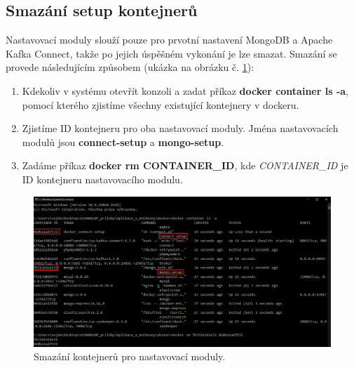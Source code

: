 \subsection{Smazání setup kontejnerů}
Nastavovací moduly slouží pouze pro prvotní nastavení MongoDB a Apache Kafka Connect, takže po jejich úspěšném vykonání je lze smazat. Smazání se provede následujícím způsobem (ukázka na obrázku č. \ref{fig:docker_remove}):
\begin{enumerate}
\item Kdekoliv v systému otevřít konzoli a zadat příkaz \textbf{docker container ls -a}, pomocí kterého zjistíme všechny existující kontejnery v dockeru.
\item Zjistíme ID kontejneru pro oba nastavovací moduly. Jména nastavovacích modulů jsou \textbf{connect-setup} a \textbf{mongo-setup}.
\item Zadáme příkaz \textbf{docker rm CONTAINER\_ID}, kde \textit{CONTAINER\_ID} je ID kontejneru nastavovacího modulu.
\end{enumerate}
	\begin{figure}[H]
	\centering
	\includegraphics[width=16cm]{img/manual/docker_remove}
	\caption{Smazání kontejnerů pro nastavovací moduly.}
	\label{fig:docker_remove}
	\end{figure}

\newpage
